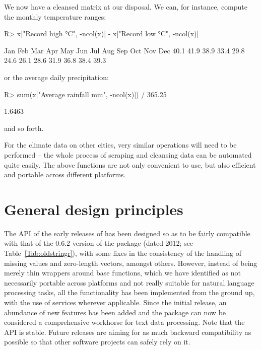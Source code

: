 \documentclass[nojss]{jss}
\begin{document}
We now have a cleansed matrix at our disposal.
We can, for instance, compute the monthly temperature ranges:

\begin{Schunk}
\begin{Sinput}
R> x["Record high °C", -ncol(x)] - x["Record low °C", -ncol(x)]
\end{Sinput}
\begin{Soutput}
 Jan  Feb  Mar  Apr  May  Jun  Jul  Aug  Sep  Oct  Nov  Dec
40.1 41.9 38.9 33.4 29.8 24.6 26.1 28.6 31.9 36.8 38.4 39.3
\end{Soutput}
\end{Schunk}

\noindent
or the average daily precipitation:

\begin{Schunk}
\begin{Sinput}
R> sum(x["Average rainfall mm", -ncol(x)]) / 365.25
\end{Sinput}
\begin{Soutput}
[1] 1.6463
\end{Soutput}
\end{Schunk}

\noindent
and so forth.

For the climate data on other cities, very similar operations
will need to be performed -- the whole process of scraping and cleansing data
can be automated quite easily.
The above functions are not only convenient to use, but also efficient
and portable across different platforms.




\section{General design principles}\label{Sec:design}

The API of the early releases of  has been designed so as
to be fairly compatible with that of the 0.6.2 version of the
 package
\citep{Wickham2010:stringr} (dated 2012; see Table~\ref{Tab:oldstringr}),
with some fixes in the
consistency of the handling of missing values and zero-length vectors,
amongst others.
However, instead of being merely thin wrappers around base 
functions, which we have identified as not necessarily portable across
platforms and not really suitable for natural language processing tasks,
all the functionality has been implemented from the ground up,
with the use of  services wherever applicable. Since the
initial release, an abundance of new features has been added
and the package can now be considered a comprehensive workhorse
for text data processing.
Note that the  API is stable.
Future releases are aiming for as much backward compatibility
as possible so that other software projects can safely rely on it.
\end{document}

